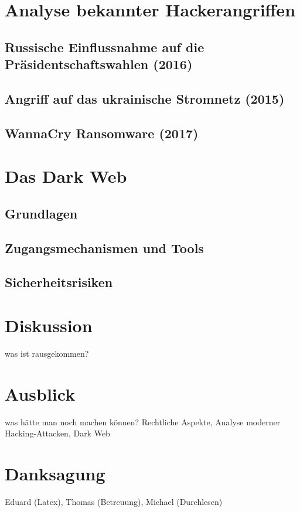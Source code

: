 \documentclass[11pt, a4paper]{article}
\begin{document}
\newpage
\section{Analyse bekannter Hackerangriffen}

\subsection{Russische Einflussnahme auf die Präsidentschaftswahlen (2016)}

\subsection{Angriff auf das ukrainische Stromnetz (2015)}

\subsection{WannaCry Ransomware (2017)}


\section{Das Dark Web}

\subsection{Grundlagen}

\subsection{Zugangsmechanismen und Tools}

\subsection{Sicherheitsrisiken}

\section{Diskussion}
was ist rausgekommen?

\section{Ausblick}
was hätte man noch machen können? Rechtliche Aspekte, Analyse moderner Hacking-Attacken, Dark Web

\section*{Danksagung}
Eduard (Latex), Thomas (Betreuung), Michael (Durchlesen)
\end{document}

